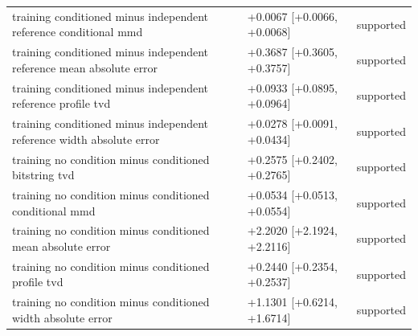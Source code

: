 \begin{table}[p]
\begin{tabular}{@{}p{}p{}p{}@{}}
training conditioned minus independent reference conditional mmd & +0.0067 [+0.0066, +0.0068] & supported \\
training conditioned minus independent reference mean absolute error & +0.3687 [+0.3605, +0.3757] & supported \\
training conditioned minus independent reference profile tvd & +0.0933 [+0.0895, +0.0964] & supported \\
training conditioned minus independent reference width absolute error & +0.0278 [+0.0091, +0.0434] & supported \\
training no condition minus conditioned bitstring tvd & +0.2575 [+0.2402, +0.2765] & supported \\
training no condition minus conditioned conditional mmd & +0.0534 [+0.0513, +0.0554] & supported \\
training no condition minus conditioned mean absolute error & +2.2020 [+2.1924, +2.2116] & supported \\
training no condition minus conditioned profile tvd & +0.2440 [+0.2354, +0.2537] & supported \\
training no condition minus conditioned width absolute error & +1.1301 [+0.6214, +1.6714] & supported \\
\bottomrule
\end{tabular}
\end{table}
\clearpage
